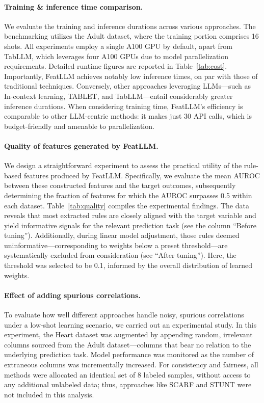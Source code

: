 \vspace*{-0.12in}
\paragraph{Training \& inference time comparison.} We evaluate the training and inference durations across various approaches. The benchmarking utilizes the Adult dataset, where the training portion comprises 16 shots. All experiments employ a single A100 GPU by default, apart from TabLLM, which leverages four A100 GPUs due to model parallelization requirements. Detailed runtime figures are reported in Table~\ref{tab:cost}. Importantly, \textsf{FeatLLM} achieves notably low inference times, on par with those of traditional techniques. Conversely, other approaches leveraging LLMs—such as In-context learning, TABLET, and TabLLM—entail considerably greater inference durations. When considering training time, \textsf{FeatLLM}'s efficiency is comparable to other LLM-centric methods: it makes just 30 API calls, which is budget-friendly and amenable to parallelization.

\vspace*{-0.12in}
\paragraph{Quality of features generated by \textsf{FeatLLM}.}
We design a straightforward experiment to assess the practical utility of the rule-based features produced by \textsf{FeatLLM}. Specifically, we evaluate the mean AUROC between these constructed features and the target outcomes, subsequently determining the fraction of features for which the AUROC surpasses 0.5 within each dataset. Table~\ref{tab:quality} compiles the experimental findings. The data reveals that most extracted rules are closely aligned with the target variable and yield informative signals for the relevant prediction task (see the column ``Before tuning”). Additionally, during linear model adjustment, those rules deemed uninformative—corresponding to weights below a preset threshold—are systematically excluded from consideration (see ``After tuning”). Here, the threshold was selected to be 0.1, informed by the overall distribution of learned weights.

\vspace*{-0.12in}
\paragraph{Effect of adding spurious correlations.} To evaluate how well different approaches handle noisy, spurious correlations under a low-shot learning scenario, we carried out an experimental study. In this experiment, the Heart dataset was augmented by appending random, irrelevant columns sourced from the Adult dataset—columns that bear no relation to the underlying prediction task. Model performance was monitored as the number of extraneous columns was incrementally increased. For consistency and fairness, all methods were allocated an identical set of 8 labeled samples, without access to any additional unlabeled data; thus, approaches like SCARF and STUNT were not included in this analysis.

